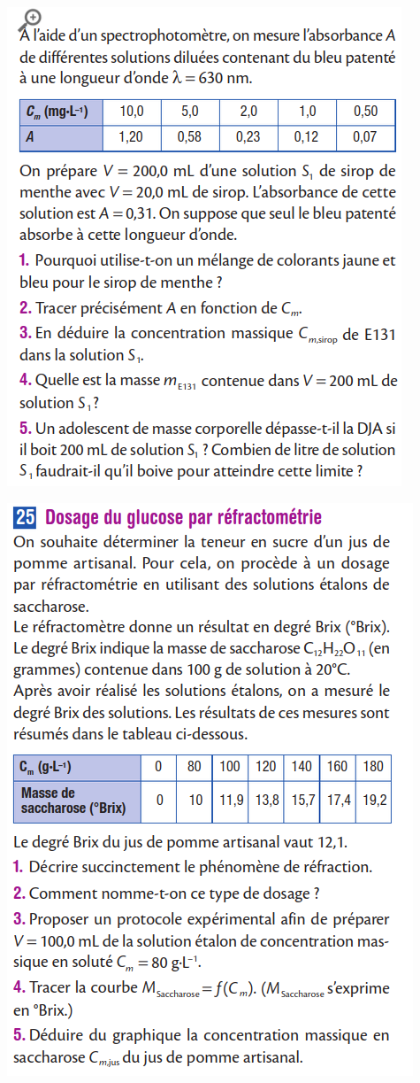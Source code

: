 \documentclass[10pt]{article}
\newcommand{\myscale}{0.41}
\begin{document}
\begin{center}
\begin{minipage}[c]{0.45\textwidth}
		\includegraphics[scale=\myscale]{assets/24b.png}



	\end{minipage}
	\hspace{0.05\textwidth}
	\begin{minipage}[c]{0.45\textwidth}
		\centering

		\includegraphics[scale=\myscale]{assets/25.png}



\end{minipage}
\end{center}
\end{document}
